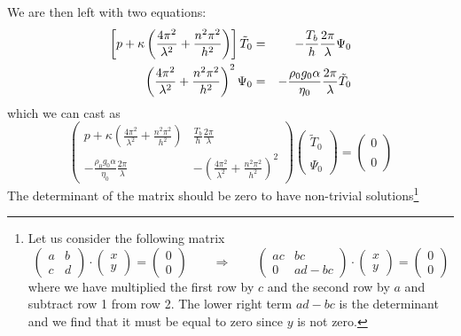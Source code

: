 We are then left with two equations:
\begin{eqnarray}
\left[ p  + \kappa \left(\frac{4\pi^2}{\lambda^2} + \frac{n^2\pi^2}{h^2}\right) \right]\tilde{T}_0 
&=& -  \frac{T_b}{h}   \frac{2 \pi}{\lambda} \Psi_0 \nonumber\\
\left( \frac{4\pi^2}{\lambda^2} + \frac{n^2\pi^2}{h^2} \right)^2 \Psi_0 
&=& -\frac{\rho_0 g_0 \alpha}{\eta_0}  \frac{2 \pi }{\lambda} \tilde{T}_0  \nonumber
\end{eqnarray}
which we can cast as
\[
\left(
\begin{array}{cc}
p  + \kappa \left(\frac{4\pi^2}{\lambda^2} + \frac{n^2\pi^2}{h^2}\right) 
& 
\frac{T_b}{h}   \frac{2 \pi}{\lambda} 
\\
-\frac{\rho_0 g_0 \alpha}{\eta_0}  \frac{2 \pi }{\lambda}
&
-\left( \frac{4\pi^2}{\lambda^2} + \frac{n^2\pi^2}{h^2} \right)^2
\end{array}
\right)
\left(
\begin{array}{c}
\tilde{T}_0 \\ \\ \Psi_0
\end{array}
\right)
=
\left(
\begin{array}{c}
0 \\ \\ 0
\end{array}
\right)
\]
The determinant of the matrix should be zero to have non-trivial solutions\footnote{
Let us consider the following matrix
\[
\left(\begin{array}{cc}
a & b \\ c & d
\end{array}\right)
\cdot
\left(\begin{array}{cc}
x \\ y
\end{array}\right)
=
\left(\begin{array}{cc}
0 \\ 0
\end{array}\right)
\qquad
\Rightarrow
\qquad
\left(\begin{array}{cc}
ac & bc \\ 0 & ad-bc
\end{array}\right)
\cdot
\left(\begin{array}{cc}
x \\ y
\end{array}\right)
=
\left(\begin{array}{cc}
0 \\ 0
\end{array}\right)
\]
where we have multiplied the first row by $c$ and the second row by $a$ and subtract row 1 from row 2. The lower right term $ad-bc$ is the determinant and we find that it must be equal to zero
since $y$ is not zero.
}
